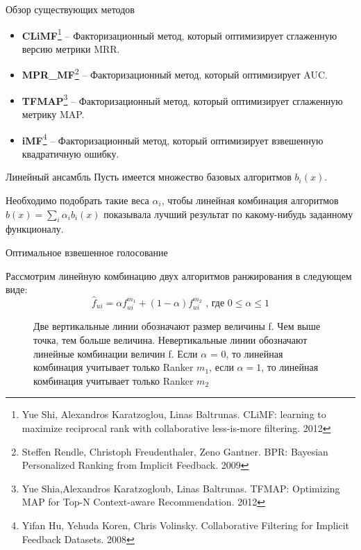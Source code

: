\documentclass[10pt,pdf,hyperref={unicode}]{beamer}
\begin{document}
\begin{frame}{Обзор существующих методов}

\begin{itemize}
\item \textbf{CLiMF}\footnote{Yue Shi, Alexandros Karatzoglou, Linas Baltrunas.
CLiMF: learning to maximize reciprocal rank with collaborative less-is-more filtering. 2012}
 -- Факторизационный метод, который оптимизирует сглаженную версию метрики MRR.
  	
\item \textbf{MPR\_MF}\footnote{Steffen Rendle, Christoph Freudenthaler, Zeno Gantner.    
         BPR: Bayesian Personalized Ranking from Implicit Feedback. 2009}
-- Факторизационный метод, который оптимизирует AUC.
\item \textbf{TFMAP}\footnote{Yue Shia,Alexandros Karatzogloub, Linas Baltrunas.
TFMAP: Optimizing MAP for Top-N Context-aware Recommendation. 2012} 
-- Факторизационный метод, который оптимизирует сглаженную метрику MAP.
\item \textbf{iMF}\footnote{Yifan Hu, Yehuda Koren, Chris Volinsky.
	Collaborative Filtering for Implicit Feedback Datasets. 2008}
-- Факторизационный метод, который оптимизирует взвешенную квадратичную ошибку.
\end{itemize}
\end{frame}

\begin{frame}{Линейный ансамбль}
Пусть имеется множество базовых алгоритмов $b_i(x)$. 

Необходимо подобрать такие веса $\alpha_i$, чтобы линейная комбинация алгоритмов $\hat{b}(x) = \sum_i \alpha_i b_i(x)$ показывала лучший результат по какому-нибудь заданному функционалу. 
\end{frame}

\begin{frame}{Оптимальное взвешенное голосование}

 Рассмотрим линейную комбинацию двух алгоритмов ранжирования  в следующем виде:
\begin{equation*}
	\hat{f}_{ui} = \alpha f_{ui}^{m_1} + (1 - \alpha) f_{ui} ^ {m_2} \textrm{\ , где $0 \leq \alpha \leq 1$}
\end{equation*} 
	
\begin{figure}[h]
\caption{Две вертикальные линии обозначают размер величины f. Чем выше точка, тем больше величина. Невертикальные линии обозначают линейные комбинации величин f. Если $\alpha$ = 0, то линейная комбинация учитывает только Ranker $m_1$, если $\alpha = 1$, то  линейная комбинация учитывает только Ranker $m_2$}
\label{pic:latexpic}
\end{figure}

\end{frame}
\end{document}
